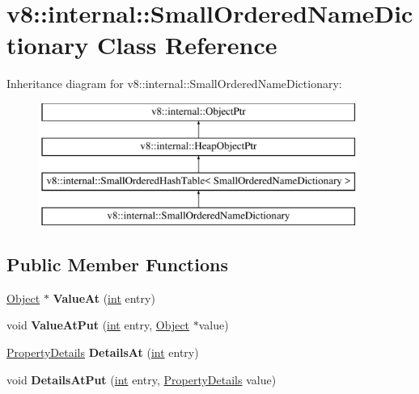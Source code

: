 \hypertarget{classv8_1_1internal_1_1SmallOrderedNameDictionary}{}\section{v8\+:\+:internal\+:\+:Small\+Ordered\+Name\+Dictionary Class Reference}
\label{classv8_1_1internal_1_1SmallOrderedNameDictionary}
Inheritance diagram for v8\+:\+:internal\+:\+:Small\+Ordered\+Name\+Dictionary\+:\begin{figure}[H]
\begin{center}
\leavevmode
\includegraphics[height=4.000000cm]{classv8_1_1internal_1_1SmallOrderedNameDictionary}
\end{center}
\end{figure}
\subsection*{Public Member Functions}
\begin{DoxyCompactItemize}
\item 
\mbox{\label{classv8_1_1internal_1_1SmallOrderedNameDictionary_ab0b256cbfa430066a49e24e5f4f80b3c}} 
\mbox{\hyperlink{classv8_1_1internal_1_1Object}{Object}} $\ast$ {\bfseries Value\+At} (\mbox{\hyperlink{classint}{int}} entry)
\item 
\mbox{\label{classv8_1_1internal_1_1SmallOrderedNameDictionary_aed45edc36519fd57e6eb2f1ec7e5ba0b}} 
void {\bfseries Value\+At\+Put} (\mbox{\hyperlink{classint}{int}} entry, \mbox{\hyperlink{classv8_1_1internal_1_1Object}{Object}} $\ast$value)
\item 
\mbox{\label{classv8_1_1internal_1_1SmallOrderedNameDictionary_a3289d28a78391ec3b0b00198e34a45ff}} 
\mbox{\hyperlink{classv8_1_1internal_1_1PropertyDetails}{Property\+Details}} {\bfseries Details\+At} (\mbox{\hyperlink{classint}{int}} entry)
\item 
\mbox{\label{classv8_1_1internal_1_1SmallOrderedNameDictionary_a7faf2ccee68d86c714575c046850c68f}} 
void {\bfseries Details\+At\+Put} (\mbox{\hyperlink{classint}{int}} entry, \mbox{\hyperlink{classv8_1_1internal_1_1PropertyDetails}{Property\+Details}} value)
\end{DoxyCompactItemize}
